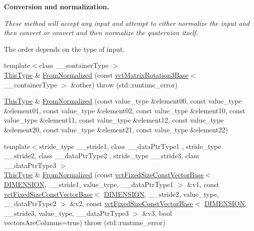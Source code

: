 \begin{Indent}{\bf Conversion and normalization.}\par
{\em These method will accept any input and attempt to either normalize the input and then convert or convert and then normalize the quaternion itself.\par
The order depends on the type of input. }\begin{DoxyCompactItemize}
\item 
{\footnotesize template$<$class \-\_\-\-\_\-container\-Type $>$ }\\\hyperlink{classvct_matrix_rotation3_base_a027be766cb10ca3c2ad8e85c28ed0af9}{This\-Type} \& \hyperlink{classvct_matrix_rotation3_base_a310d37178d973b7401402980505b5712}{From\-Normalized} (const \hyperlink{classvct_matrix_rotation3_base}{vct\-Matrix\-Rotation3\-Base}$<$ \-\_\-\-\_\-container\-Type $>$ \&other)  throw (std\-::runtime\-\_\-error)
\item 
\hyperlink{classvct_matrix_rotation3_base_a027be766cb10ca3c2ad8e85c28ed0af9}{This\-Type} \& \hyperlink{classvct_matrix_rotation3_base_ab970705d12cfdd0293630afae6190e6f}{From\-Normalized} (const value\-\_\-type \&element00, const value\-\_\-type \&element01, const value\-\_\-type \&element02, const value\-\_\-type \&element10, const value\-\_\-type \&element11, const value\-\_\-type \&element12, const value\-\_\-type \&element20, const value\-\_\-type \&element21, const value\-\_\-type \&element22)
\item 
{\footnotesize template$<$stride\-\_\-type \-\_\-\-\_\-stride1, class \-\_\-\-\_\-data\-Ptr\-Type1 , stride\-\_\-type \-\_\-\-\_\-stride2, class \-\_\-\-\_\-data\-Ptr\-Type2 , stride\-\_\-type \-\_\-\-\_\-stride3, class \-\_\-\-\_\-data\-Ptr\-Type3 $>$ }\\\hyperlink{classvct_matrix_rotation3_base_a027be766cb10ca3c2ad8e85c28ed0af9}{This\-Type} \& \hyperlink{classvct_matrix_rotation3_base_a1bf7b37eb0d22dab699130ede5c32506}{From\-Normalized} (const \hyperlink{classvct_fixed_size_const_vector_base}{vct\-Fixed\-Size\-Const\-Vector\-Base}$<$ \hyperlink{classvct_matrix_rotation3_base_a97514c086bdd3a691714817775b02f21a43f9b5ba9769ee62eadd8398853504cd}{D\-I\-M\-E\-N\-S\-I\-O\-N}, \-\_\-\-\_\-stride1, value\-\_\-type, \-\_\-\-\_\-data\-Ptr\-Type1 $>$ \&v1, const \hyperlink{classvct_fixed_size_const_vector_base}{vct\-Fixed\-Size\-Const\-Vector\-Base}$<$ \hyperlink{classvct_matrix_rotation3_base_a97514c086bdd3a691714817775b02f21a43f9b5ba9769ee62eadd8398853504cd}{D\-I\-M\-E\-N\-S\-I\-O\-N}, \-\_\-\-\_\-stride2, value\-\_\-type, \-\_\-\-\_\-data\-Ptr\-Type2 $>$ \&v2, const \hyperlink{classvct_fixed_size_const_vector_base}{vct\-Fixed\-Size\-Const\-Vector\-Base}$<$ \hyperlink{classvct_matrix_rotation3_base_a97514c086bdd3a691714817775b02f21a43f9b5ba9769ee62eadd8398853504cd}{D\-I\-M\-E\-N\-S\-I\-O\-N}, \-\_\-\-\_\-stride3, value\-\_\-type, \-\_\-\-\_\-data\-Ptr\-Type3 $>$ \&v3, bool vectors\-Are\-Columns=true)  throw (std\-::runtime\-\_\-error)

\end{DoxyCompactItemize}
\end{Indent}
